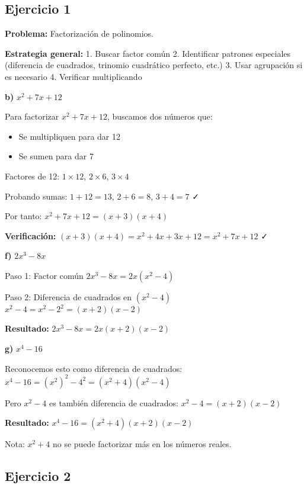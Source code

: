 
\subsection*{Ejercicio 1}

\textbf{Problema:} Factorización de polinomios.

\textbf{Estrategia general:}
1. Buscar factor común
2. Identificar patrones especiales (diferencia de cuadrados, trinomio cuadrático perfecto, etc.)
3. Usar agrupación si es necesario
4. Verificar multiplicando

\textbf{b)} $x^2 + 7x + 12$

Para factorizar $x^2 + 7x + 12$, buscamos dos números que:
\begin{itemize}
    \item Se multipliquen para dar 12
    \item Se sumen para dar 7
\end{itemize}

Factores de 12: $1 \times 12$, $2 \times 6$, $3 \times 4$

Probando sumas: $1 + 12 = 13$, $2 + 6 = 8$, $3 + 4 = 7$ ✓

Por tanto: $x^2 + 7x + 12 = (x + 3)(x + 4)$

\textbf{Verificación:} $(x + 3)(x + 4) = x^2 + 4x + 3x + 12 = x^2 + 7x + 12$ ✓

\textbf{f)} $2x^3 - 8x$

Paso 1: Factor común
$2x^3 - 8x = 2x(x^2 - 4)$

Paso 2: Diferencia de cuadrados en $(x^2 - 4)$
$x^2 - 4 = x^2 - 2^2 = (x + 2)(x - 2)$

\textbf{Resultado:} $2x^3 - 8x = 2x(x + 2)(x - 2)$

\textbf{g)} $x^4 - 16$

Reconocemos esto como diferencia de cuadrados:
$x^4 - 16 = (x^2)^2 - 4^2 = (x^2 + 4)(x^2 - 4)$

Pero $x^2 - 4$ es también diferencia de cuadrados:
$x^2 - 4 = (x + 2)(x - 2)$

\textbf{Resultado:} $x^4 - 16 = (x^2 + 4)(x + 2)(x - 2)$

Nota: $x^2 + 4$ no se puede factorizar más en los números reales.

\subsection*{Ejercicio 2}

